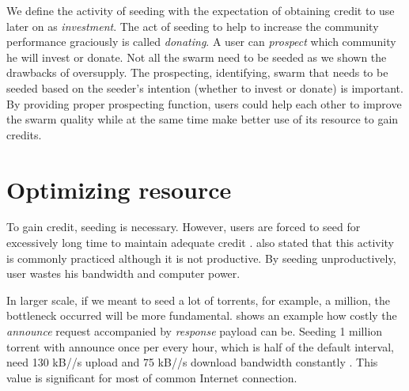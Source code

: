 We define the activity of seeding with the expectation of obtaining credit to use later on as \textit{investment}. The act of seeding to help to increase the community performance graciously is called \textit{donating}. A user can \textit{prospect} which community he will invest or donate. Not all the swarm need to be seeded as we shown the drawbacks of oversupply. The prospecting, identifying, swarm that needs to be seeded based on the seeder's intention (whether to invest or donate) is important. By providing proper prospecting function, users could help each other to improve the swarm quality while at the same time make better use of its resource to gain credits. 


\section{Optimizing resource}
To gain credit, seeding is necessary. However, users are forced to seed for excessively long time to maintain adequate credit \cite{2013:survivepriv:jia}. \citeauthor{2013:survivepriv:jia} also stated that this activity is commonly practiced although it is not productive. By seeding unproductively, user wastes his bandwidth and computer power.

In larger scale, if we meant to seed a lot of torrents, for example, a million, the bottleneck occurred will be more fundamental. \citeauthor{2012:milliontorrent:arvid} shows an example how costly the \textit{announce} request accompanied by \textit{response} payload can be. Seeding 1 million torrent with announce once per every hour, which is half of the default interval, need 130 kB//s upload and 75 kB//s download bandwidth constantly \cite{2012:milliontorrent:arvid}. This value is significant for most of common Internet connection.

%



